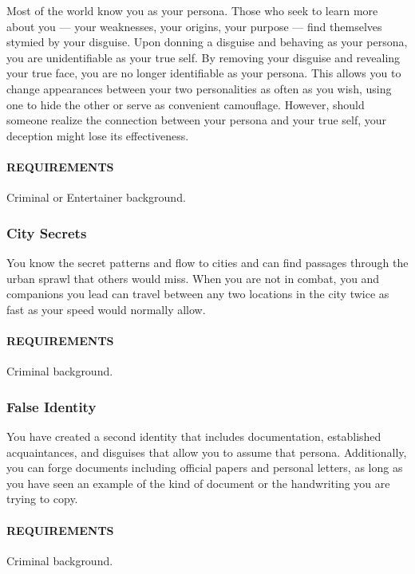     Most of the world know you as your persona.
    Those who seek to learn more about you --- your weaknesses, your origins, your purpose --- find themselves stymied by your disguise.
    Upon donning a disguise and behaving as your persona, you are unidentifiable as your true self.
    By removing your disguise and revealing your true face, you are no longer identifiable as your persona.
    This allows you to change appearances between your two personalities as often as you wish, using one to hide the other or serve as convenient camouflage.
    However, should someone realize the connection between your persona and your true self, your deception might lose its effectiveness.
    \paragraph{REQUIREMENTS} Criminal or Entertainer background.

    \subsubsection{City Secrets} \label{feat::citysecrets}
    You know the secret patterns and flow to cities and can find passages through the urban sprawl that others would miss.
    When you are not in combat, you and companions you lead can travel between any two locations in the city twice as fast as your speed would normally allow.
    \paragraph{REQUIREMENTS} Criminal background.

    \subsubsection{False Identity} \label{feat::falseidentity}
    You have created a second identity that includes documentation, established acquaintances, and disguises that allow you to assume that persona.
    Additionally, you can forge documents including official papers and personal letters, as long as you have seen an example of the kind of document or the handwriting you are trying to copy.
    \paragraph{REQUIREMENTS} Criminal background.


